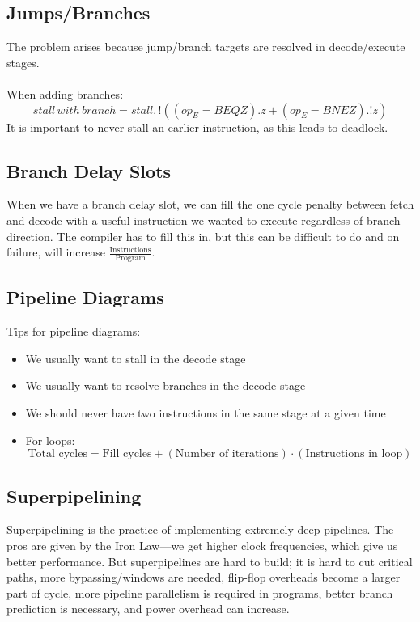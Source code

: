 \documentclass{article}
\begin{document}
\subsection{Jumps/Branches}

The problem arises because jump/branch targets are resolved in decode/execute stages. \\
\\
When adding branches:
$$ stall \, with \, branch = stall . \, !((op_E=BEQZ).z + (op_E=BNEZ).!z) $$
It is important to never stall an earlier instruction, as this leads to deadlock.

\subsection{Branch Delay Slots}
When we have a branch delay slot, we can fill the one cycle penalty between fetch and decode with a useful instruction we wanted to execute regardless of branch direction. The compiler has to fill this in, but this can be difficult to do and on failure, will increase $\frac{\text{Instructions}}{\text{Program}}$.

\subsection{Pipeline Diagrams}

Tips for pipeline diagrams:
\begin{itemize}
\item We usually want to stall in the decode stage
\item We usually want to resolve branches in the decode stage
\item We should never have two instructions in the same stage at a given time
\item For loops:
$$ \text{Total cycles} = \text{Fill cycles} + (\text{Number of iterations}) \cdot (\text{Instructions in loop}) $$
\end{itemize}

\subsection{Superpipelining}

Superpipelining is the practice of implementing extremely deep pipelines. The pros are given by the Iron Law---we get higher clock frequencies, which give us better performance. But superpipelines are hard to build; it is hard to cut critical paths, more bypassing/windows are needed, flip-flop overheads become a larger part of cycle, more pipeline parallelism is required in programs, better branch prediction is necessary, and power overhead can increase.
\end{document}
